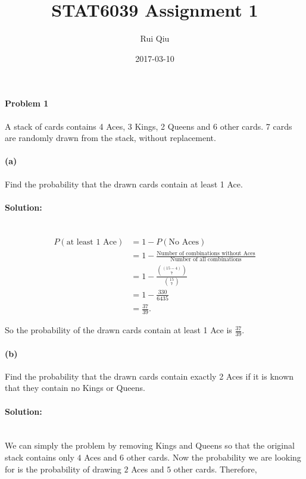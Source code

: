 \documentclass[a4paper, 11pt, twoside]{article}
\begin{document}
\title{STAT6039 Assignment 1}
\author{Rui Qiu}
\date{2017-03-10}

\maketitle

\paragraph{Problem 1}

A stack of  cards contains 4 Aces, 3 Kings, 2 Queens and 6 other cards. 7 cards are randomly drawn from the stack, without replacement.

\paragraph{(a)} Find the probability that the drawn cards contain at least 1 Ace.

\paragraph{Solution:}\ \\
\[
\begin{split}
	P(\text{at least 1 Ace}) &= 1 - P(\text{No Aces})\\
	&= 1 - \frac{\text{Number of combinations without Aces}}{\text{Number of all combinations}}\\
	&= 1 - \frac{{(15-4) \choose 7}}{{15 \choose 7}}\\
	&= 1 - \frac{330}{6435}\\
	&= \frac{37}{39}.
\end{split}
\]

So the probability of the drawn cards contain at least 1 Ace is $\frac{37}{39}$.

\paragraph{(b)} Find the probability that the drawn cards contain exactly 2 Aces if it is known that they contain no Kings or Queens.

\paragraph{Solution:}\ \\

We can simply the problem by removing Kings and Queens so that the original stack contains only $4$ Aces and $6$ other cards. Now the probability we are looking for is the probability of drawing $2$ Aces and $5$ other cards. Therefore,
\end{document}
